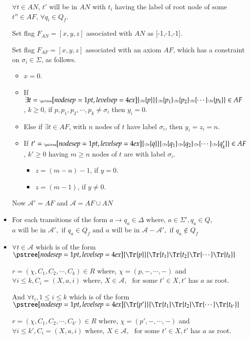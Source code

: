 \begin{itemize}
	$\forall t\in AN$,  $t'$ will be in $AN$ with $t_i$ having the label of root node of some $t''\in AF$, $\forall q_i\in Q_f$.


 	Set flag $F_{AN}=[x,y,z]$ associated with $AN$ as  [-1,-1,-1].

 Set  flag $F_{AF}=[x,y,z]$ associated with an axiom $AF$, which has a constraint on 
$\sigma_i\in\Sigma$, as follows.
\begin{itemize}
	\item $x=0$.
	\item If $\exists t=
		{\tiny
		\pstree[nodesep=1pt,levelsep=4ex]{\Tr{p}}
        	{
            		\Tr{p_1}
            		\Tr{p_2}
			\Tr{\cdots }
			\Tr{p_k}
	        }}\in AF$ , $k\geq 0$, if  $p,p_1,p_2,\cdots ,p_k\neq \sigma_i$ then $y_i=0$.
	\item Else if $\exists t\in AF$, with $n$ nodes of $t$ have label $\sigma_i$, then $y_i=z_i=n$.
	\item If $t'=
		{\tiny
		\pstree[nodesep=1pt,levelsep=4ex]{\Tr{q}}
        	{
            		\Tr{q_1}
            		\Tr{q_2}
			\Tr{\cdots }
			\Tr{q_k'}
	        }}\in AF$ , $k'\geq 0$ having $m\geq n$ nodes of $t$ are with label $\sigma_i$.
		\begin{itemize}
			\item $z=(m-n)-1$, if $y=0$.
			\item $z=(m-1)$, if $y\neq 0$.
		\end{itemize}

	\end{itemize}
	
		Now $\mathcal{A} '=AF$ and $\mathcal{A}=AF\cup AN$


	\item For each transitions of the form $a\rightarrow q_a \in \Delta$ where, $a\in \Sigma ', q_a\in Q$, $a \mbox{ will be in } \mathcal{A} ', 
		\mbox{ if }$\hbox{$ q_a\in Q_f$}$\mbox{ and } a $ will be in $\mathcal{A-A}',\mbox{ if } q_a\notin Q_f $ 
	\item $\forall t\in \mathcal{A}$ which is of the form 
		{\tiny
		$
		\pstree[nodesep=1pt,levelsep=4ex]{\Tr{p}}
        	{
		\Tr{t_1}
            		\Tr{t_2}
			\Tr{\cdots }
			\Tr{t_k}
	        }
		$}	

		$r=(\chi,C_1,C_2,\cdots ,C_k)\in R$ where, $\chi=(p,-,\cdots,-)$ and $\forall i\leq k, C_i=(X,a,i)$ where, \hbox{$X\in \mathcal{A},$} 
		$\mbox{ for some }$\hbox{$ t'\in X,$}$ t'$ has $a$ as root.

		And $\forall t_i, 1\leq i\leq k$ which is of the form
		{\tiny
		$
		\pstree[nodesep=1pt,levelsep=4ex]{\Tr{p'}}
        	{
            		\Tr{t_1}
            		\Tr{t_2}
			\Tr{\cdots }
			\Tr{t_{k'}}
	        }
		$}	
	
		$r=(\chi,C_1,C_2,\cdots ,C_{k'})\in R$ where, $\chi=(p',-,\cdots,-)$ and $\forall i\leq k', C_i=(X,a,i)$ where, \hbox{$X\in \mathcal{A},$} 
		$\mbox{ for some } t'\in X,t'$ has $a$ as root.



\end{itemize}

